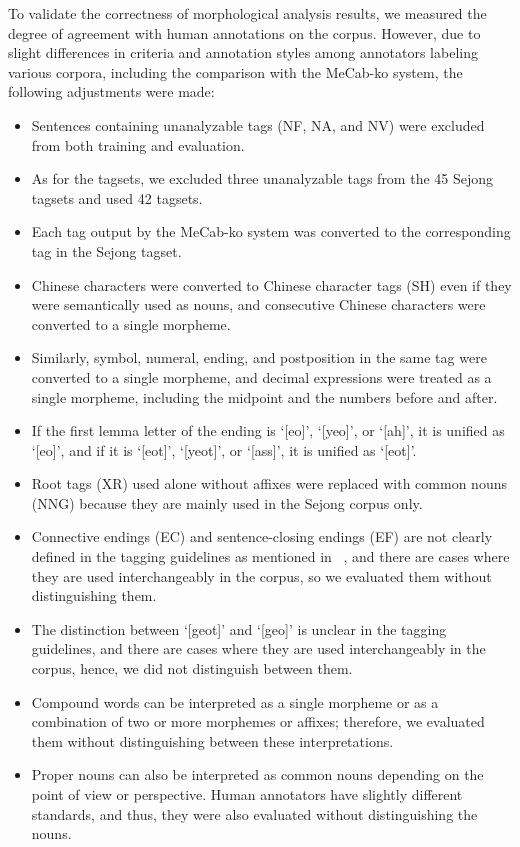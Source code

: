 \documentclass[AMS,STIX2COL]{WileyNJD-v2}
\begin{document}
    To validate the correctness of morphological analysis results, we measured the degree of agreement with human annotations on the corpus.
    However, due to slight differences in criteria and annotation styles among annotators labeling various corpora, including the comparison with the MeCab-ko system, the following adjustments were made:
    \begin{itemize}
        \item Sentences containing unanalyzable tags (NF, NA, and NV) were excluded from both training and evaluation.
        \item As for the tagsets, we excluded three unanalyzable tags from the 45 Sejong tagsets and used 42 tagsets.
        \item Each tag output by the MeCab-ko system was converted to the corresponding tag in the Sejong tagset.
        \item Chinese characters were converted to Chinese character tags (SH) even if they were semantically used as nouns, and consecutive Chinese characters were converted to a single morpheme.
        \item Similarly, symbol, numeral, ending, and postposition in the same tag were converted to a single morpheme, and decimal expressions were treated as a single morpheme, including the midpoint and the numbers before and after.
        \item If the first lemma letter of the ending is `[eo]', `[yeo]', or `[ah]', it is unified as `[eo]', and if it is `[eot]', `[yeot]', or `[ass]', it is unified as `[eot]'. %
        \item Root tags (XR) used alone without affixes were replaced with common nouns (NNG) because they are mainly used in the Sejong corpus only.
        \item Connective endings (EC) and sentence-closing endings (EF) are not clearly defined in the tagging guidelines as mentioned in ~\cite{KimIH2010}, and there are cases where they are used interchangeably in the corpus, so we evaluated them without distinguishing them.
        \item The distinction between `[geot]' and `[geo]' is unclear in the tagging guidelines, and there are cases where they are used interchangeably in the corpus, hence, we did not distinguish between them. %
        \item Compound words can be interpreted as a single morpheme or as a combination of two or more morphemes or affixes; therefore, we evaluated them without distinguishing between these interpretations.
        \item Proper nouns can also be interpreted as common nouns depending on the point of view or perspective. Human annotators have slightly different standards, and thus, they were also evaluated without distinguishing the nouns.
    \end{itemize}
\end{document}
